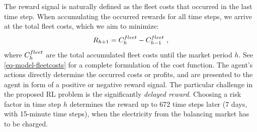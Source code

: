 \documentclass[a4paper, 12pt]{article}
\begin{document}
The reward signal is naturally defined as the fleet costs that occurred in the
last time step. When accumulating the occurred rewards for all time steps, we
arrive at the total fleet costs, which we aim to minimize:
\begin{equation}
    R_{h+1} = C^{fleet}_{h} - C^{fleet}_{h-1} \text{ ,}
\end{equation}
where \(C^{fleet}_{h}\) are the total accumulated fleet costs until the market period
\(h\). See \eqref{eq-model-fleetcosts} for a complete formulation of the cost
function. The agent's actions directly determine the occurred costs or profits,
and are presented to the agent in form of a positive or negative reward signal.
The particular challenge in the proposed RL problem is the significantly
\emph{delayed reward}. Choosing a risk factor in time step \(h\) determines the reward
up to 672 time steps later (7 days, with 15-minute time steps), when the
electricity from the balancing market has to be charged.
\end{document}

